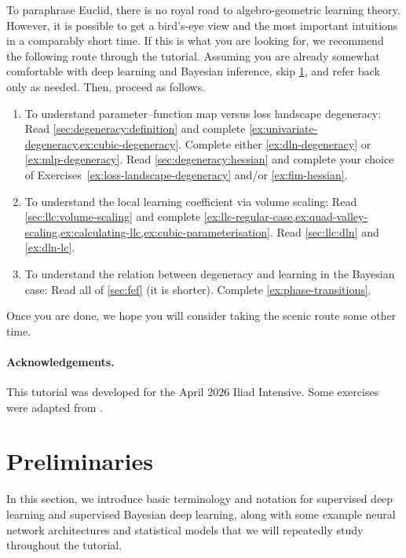 \documentclass[11pt]{article}
\begin{document}
To paraphrase Euclid, there is no royal road to algebro-geometric learning
theory. However, it is possible to get a bird's-eye view and the most important
intuitions in a comparably short time. If this is what you are looking for, we
recommend the following route through the tutorial. Assuming you are already
somewhat comfortable with deep learning and Bayesian inference, skip
\cref{sec:prelims}, and refer back only as needed. Then, proceed as follows.
\begin{enumerate}
    \item
        To understand parameter--function map versus loss landscape degeneracy:
        Read \cref{sec:degeneracy:definition} and complete
        \cref{ex:univariate-degeneracy,ex:cubic-degeneracy}.
        Complete either \cref{ex:dln-degeneracy} or \ref{ex:mlp-degeneracy}.
        Read \cref{sec:degeneracy:hessian} and complete your choice of
            Exercises~\ref{ex:loss-landscape-degeneracy} and/or \ref{ex:fim-hessian}.
    \item
        To understand the local learning coefficient via volume scaling:
        Read \cref{sec:llc:volume-scaling} and complete
        \cref{ex:llc-regular-case,ex:quad-valley-scaling,ex:calculating-llc,ex:cubic-parameterisation}.
        Read \cref{sec:llc:dln} and \cref{ex:dln-lc}.
    \item
        To understand the relation between degeneracy and learning in the
        Bayesian case:
        Read all of \cref{sec:fef} (it is shorter).
        Complete \cref{ex:phase-transitions}.
\end{enumerate}
Once you are done, we hope you will consider taking the scenic route some other
time.

\paragraph{Acknowledgements.}

This tutorial was developed for the April 2026 Iliad Intensive.
Some exercises were adapted from \citet{Furman2024}.

\clearpage
\section{Preliminaries}
\label{sec:prelims}

In this section, we introduce basic terminology and notation for supervised
deep learning and supervised Bayesian deep learning, along with some example
neural network architectures and statistical models that we will repeatedly
study throughout the tutorial.
\end{document}
